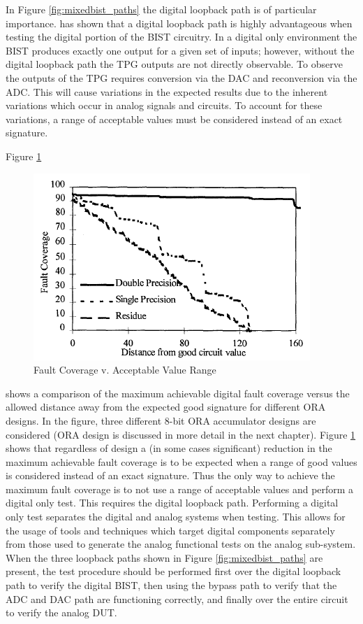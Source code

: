 \documentclass[12pt]{report}
\begin{document}
In Figure \ref{fig:mixedbist_paths} the digital loopback path is of particular importance.  \cite{stroud-analog} has shown that a digital loopback path is highly advantageous when testing the digital portion of the BIST circuitry.  In a digital only environment the BIST produces exactly one output for a given set of inputs; however, without the digital loopback path the TPG outputs are not directly observable.  To observe the outputs of the TPG requires conversion via the DAC and reconversion via the ADC.  This will cause variations in the expected results due to the inherent variations which occur in analog signals and circuits.   To account for these variations, a range of acceptable values must be considered instead of an exact signature\cite{stroud-analog}.  

Figure \ref{fig:analog-faultcvg}
\begin{figure}
	\begin{center}
		\includegraphics[scale=.6]{images/analog-fault-coverage}
	\end{center}
	\caption{Fault Coverage v. Acceptable Value Range\cite{stroud-analog}}
	\label{fig:analog-faultcvg}
\end{figure}
shows a comparison of the maximum achievable digital fault coverage versus the allowed distance away from the expected good signature for different ORA designs.  In the figure, three different 8-bit ORA accumulator designs are considered  (ORA design is discussed in more detail in the next chapter).   Figure \ref{fig:analog-faultcvg} shows that regardless of design a (in some cases significant) reduction in the maximum achievable fault coverage is to be expected when a range of good values is considered instead of an exact signature.  Thus the only way to achieve the maximum fault coverage is to not use a range of acceptable values and perform a digital only test.  This requires the digital loopback path\cite{stroud-analog}.  Performing a digital only test separates the digital and analog systems when testing.  This allows for the usage of tools and techniques which target digital components separately from those used to generate the analog functional tests on the analog sub-system\cite{stroud-analog}.  When the three loopback paths shown in Figure \ref{fig:mixedbist_paths} are present, the test procedure should be performed first over the digital loopback path to verify the digital BIST, then using the bypass path to verify that the ADC and DAC path are functioning correctly, and finally over the entire circuit to verify the analog DUT\cite{syschip}\cite{stroud-analog}.
\end{document}
